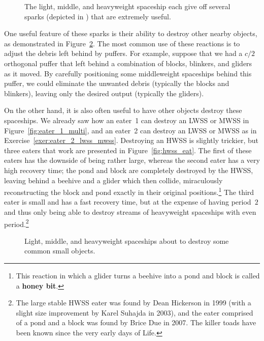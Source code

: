 \begin{figure}[!htb]
	\centering {}
	\caption{The light, middle, and heavyweight spaceship each give off several sparks (depicted in ) that are extremely useful.}\label{fig:lwss_mwss_hwssb}
\end{figure}

One useful feature of these sparks is their ability to destroy other nearby objects, as demonstrated in Figure~\ref{fig:orthogonal_destroy}. The most common use of these reactions is to adjust the debris left behind by puffers. For example, suppose that we had a $c/2$ orthogonal puffer that left behind a combination of blocks, blinkers, and gliders as it moved. By carefully positioning some middleweight spaceships behind this puffer, we could eliminate the unwanted debris (typically the blocks and blinkers), leaving only the desired output (typically the gliders).

On the other hand, it is also often useful to have other objects destroy these spaceships. We already saw how an eater~1 can destroy an LWSS or MWSS in Figure~\ref{fig:eater_1_multi}, and an eater~2 can destroy an LWSS or MWSS as in Exercise~\ref{exer:eater_2_lwss_mwss}. Destroying an HWSS is slightly trickier, but three eaters that work are presented in Figure~\ref{fig:hwss_eat}. The first of these eaters has the downside of being rather large, whereas the second eater has a very high recovery time; the pond and block are completely destroyed by the HWSS, leaving behind a beehive and a glider which then collide, miraculously reconstructing the block and pond exactly in their original positions.\footnote{This reaction in which a glider turns a beehive into a pond and block is called a \textbf{honey bit}.} The third eater is small and has a fast recovery time, but at the expense of having period~$2$ and thus only being able to destroy streams of heavyweight spaceships with even period.\footnote{The large stable HWSS eater was found by Dean Hickerson in 1999 (with a slight size improvement by Karel Suhajda in 2003), and the eater comprised of a pond and a block was found by Brice Due in 2007. The killer toads have been known since the very early days of Life.}

\begin{figure}[!htb]
	\centering {}
	\caption{Light, middle, and heavyweight spaceships about to destroy some common small objects.}\label{fig:orthogonal_destroy}
\end{figure}


